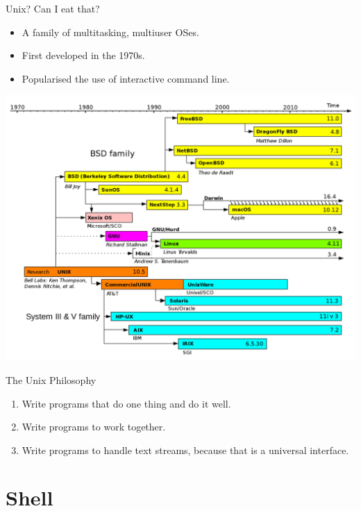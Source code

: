 \documentclass[12pt]{beamer}
\begin{document}
\begin{frame}{Unix? Can I eat that?}
  \begin{itemize}
    \item A family of multitasking, multiuser OSes.
    \item First developed in the 1970s.
    \item Popularised the use of interactive command line.
  \end{itemize}
  \begin{center}
    \includegraphics[width=0.6\linewidth]{unix_timeline}
  \end{center}
\end{frame}

\begin{frame}{The Unix Philosophy}
  \begin{enumerate}
    \item Write programs that do one thing and do it well.
    \item Write programs to work together.
    \item Write programs to handle text streams, because that is a universal interface.
  \end{enumerate}
\end{frame}

\section{Shell}
\end{document}
